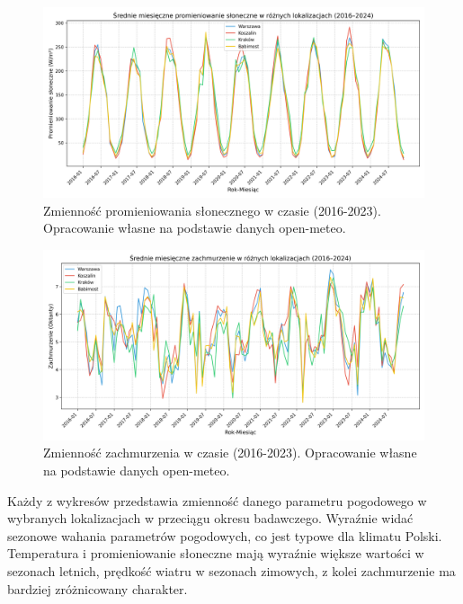 \begin{figure}[H]
    \centering
    \includegraphics[width=\textwidth]{../plots/weather/solar_radiation_time_series_full.png}
    \caption{Zmienność promieniowania słonecznego w czasie (2016-2023). Opracowanie własne na podstawie danych open-meteo.}
    \label{fig:solar-radiation-time-series-full}
\end{figure}

\begin{figure}[H]
    \centering
    \includegraphics[width=\textwidth]{../plots/weather/cloud_cover_time_series_full.png}
    \caption{Zmienność zachmurzenia w czasie (2016-2023). Opracowanie własne na podstawie danych open-meteo.}
    \label{fig:cloud-cover-time-series-full}
\end{figure}

Każdy z wykresów przedstawia zmienność danego parametru pogodowego w wybranych lokalizacjach w przeciągu okresu badawczego. Wyraźnie widać sezonowe wahania parametrów pogodowych, co jest typowe dla klimatu Polski. Temperatura i promieniowanie słoneczne mają wyraźnie większe wartości w sezonach letnich, prędkość wiatru w sezonach zimowych, z kolei zachmurzenie ma bardziej zróżnicowany charakter.

